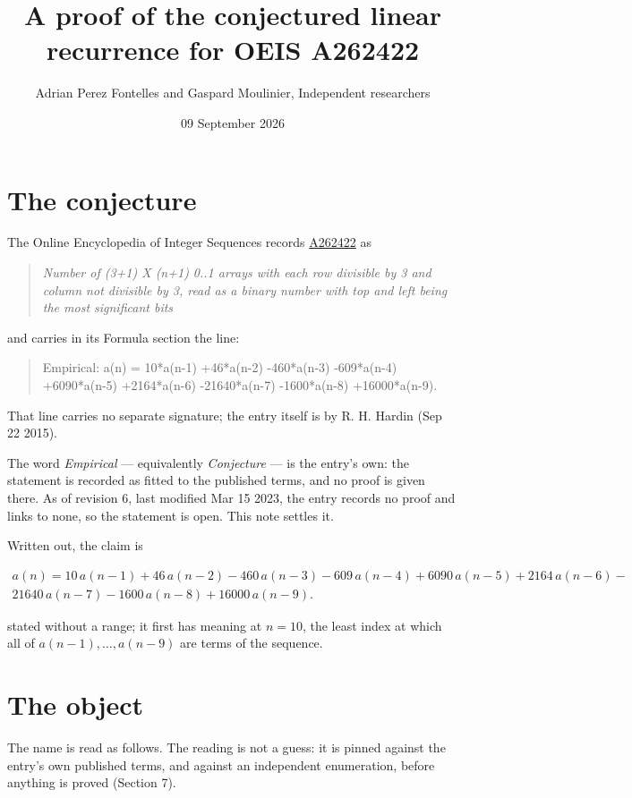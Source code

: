 \documentclass[11pt]{article}
\title{A proof of the conjectured linear recurrence for OEIS A262422}
\author{Adrian Perez Fontelles and Gaspard Moulinier, Independent researchers}
\date{09 September 2026}
\theoremstyle{definition}
\begin{document}
\maketitle
\section{The conjecture}

The Online Encyclopedia of Integer Sequences records \href{https://oeis.org/A262422}{A262422} as

\begin{quote}\itshape Number of (3+1) X (n+1) 0..1 arrays with each row divisible by 3 and column not divisible by 3, read as a binary number with top and left being the most significant bits\end{quote}

and carries in its Formula section the line:

\begin{quote}\ttfamily Empirical: a(n) = 10*a(n-1) +46*a(n-2) -460*a(n-3) -609*a(n-4) +6090*a(n-5) +2164*a(n-6) -21640*a(n-7) -1600*a(n-8) +16000*a(n-9).\end{quote}

That line carries no separate signature; the entry itself is by R. H. Hardin (Sep 22 2015).

The word {\itshape Empirical} --- equivalently {\itshape Conjecture} --- is the entry's own: the statement is recorded as fitted to the published terms, and no proof is given there. As of revision 6, last modified Mar 15 2023, the entry records no proof and links to none, so the statement is open. This note settles it.

Written out, the claim is

\begin{multline*} a(n) = 10\,a(n-1) + 46\,a(n-2) - 460\,a(n-3) - 609\,a(n-4) + 6090\,a(n-5) + 2164\,a(n-6) - \\ 21640\,a(n-7) - 1600\,a(n-8) + 16000\,a(n-9). \end{multline*}

stated without a range; it first has meaning at $n = 10$, the least index at which all of $a(n-1),\dots,a(n-9)$ are terms of the sequence.

\section{The object}

The name is read as follows. The reading is not a guess: it is pinned against the entry's own published terms, and against an independent enumeration, before anything is proved (Section 7).
\end{document}
